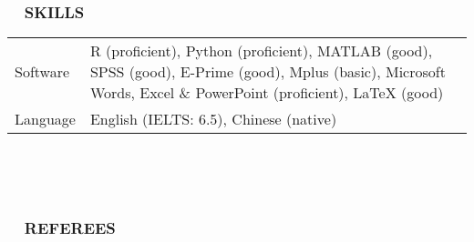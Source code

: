 \documentclass[a4paper, 12pt]{article}
\begin{document}
\  \par


\subsubsection*{ \ \ SKILLS}

\begin{tabularx}{\textwidth}{p{2cm} X}
    
    Software & R (proficient), Python (proficient), MATLAB (good), SPSS (good), E-Prime (good), Mplus (basic), Microsoft Words, Excel \& PowerPoint (proficient), LaTeX (good) \\
    
    Language & English (IELTS: 6.5), Chinese (native) \\
    
    \end{tabularx}

\  \par
\  \par


\subsubsection*{ \ \ REFEREES}



\end{document}
